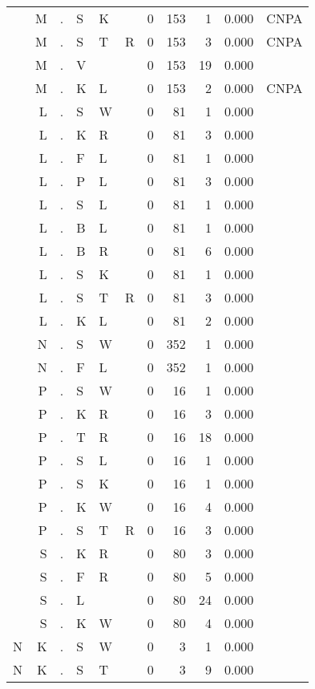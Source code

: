 \begin{longtable}{r@{ } r@{ } c@{ } l@{ } l@{ } l@{ } r r r r l }
  & M & . & S & K &   & 0 & 153 & 1 & 0.000 & \textsc{CNPA} \\
  & M & . & S & T & R & 0 & 153 & 3 & 0.000 & \textsc{CNPA} \\
  & M & . & V &   &   & 0 & 153 & 19 & 0.000 &  \\
  & M & . & K & L &   & 0 & 153 & 2 & 0.000 & \textsc{CNPA} \\
  & L & . & S & W &   & 0 & 81 & 1 & 0.000 &  \\
  & L & . & K & R &   & 0 & 81 & 3 & 0.000 &  \\
  & L & . & F & L &   & 0 & 81 & 1 & 0.000 &  \\
  & L & . & P & L &   & 0 & 81 & 3 & 0.000 &  \\
  & L & . & S & L &   & 0 & 81 & 1 & 0.000 &  \\
  & L & . & B & L &   & 0 & 81 & 1 & 0.000 &  \\
  & L & . & B & R &   & 0 & 81 & 6 & 0.000 &  \\
  & L & . & S & K &   & 0 & 81 & 1 & 0.000 &  \\
  & L & . & S & T & R & 0 & 81 & 3 & 0.000 &  \\
  & L & . & K & L &   & 0 & 81 & 2 & 0.000 &  \\
  & N & . & S & W &   & 0 & 352 & 1 & 0.000 &  \\
  & N & . & F & L &   & 0 & 352 & 1 & 0.000 &  \\
  & P & . & S & W &   & 0 & 16 & 1 & 0.000 &  \\
  & P & . & K & R &   & 0 & 16 & 3 & 0.000 &  \\
  & P & . & T & R &   & 0 & 16 & 18 & 0.000 &  \\
  & P & . & S & L &   & 0 & 16 & 1 & 0.000 &  \\
  & P & . & S & K &   & 0 & 16 & 1 & 0.000 &  \\
  & P & . & K & W &   & 0 & 16 & 4 & 0.000 &  \\
  & P & . & S & T & R & 0 & 16 & 3 & 0.000 &  \\
  & S & . & K & R &   & 0 & 80 & 3 & 0.000 &  \\
  & S & . & F & R &   & 0 & 80 & 5 & 0.000 &  \\
  & S & . & L &   &   & 0 & 80 & 24 & 0.000 &  \\
  & S & . & K & W &   & 0 & 80 & 4 & 0.000 &  \\
N & K & . & S & W &   & 0 & 3 & 1 & 0.000 &  \\
N & K & . & S & T &   & 0 & 3 & 9 & 0.000 &  \\

\end{longtable}
